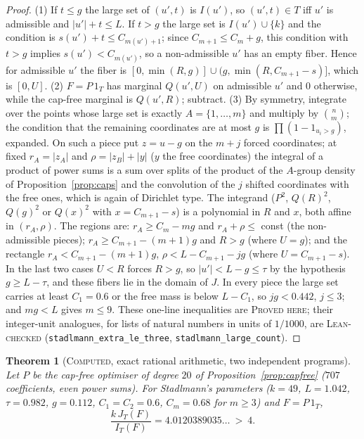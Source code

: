 \documentclass[11pt]{amsart}
\newtheorem{theorem}{Theorem}
\theoremstyle{definition}
\theoremstyle{remark}
\newcommand{\lbl}[1]{\textup{\textsc{#1}}}
\begin{document}
\begin{proof}
(1) If $t\le g$ the large set of $(u',t)$ is $I(u')$, so $(u',t)\in T$ iff
$u'$ is admissible and $|u'|+t\le L$. If $t>g$ the large set is
$I(u')\cup\{k\}$ and the condition is $s(u')+t\le C_{m(u')+1}$; since
$C_{m+1}\le C_m+g$, this condition with $t>g$ implies
$s(u')<C_{m(u')}$, so a non-admissible $u'$ has an empty fiber. Hence for
admissible $u'$ the fiber is $[0,\min(R,g)]\cup(g,\min(R,C_{m+1}-s)]$, which
is $[0,U]$. (2) $F=P\,1_T$ has marginal $Q(u',U)$ on admissible $u'$ and $0$
otherwise, while the cap-free marginal is $Q(u',R)$; subtract. (3) By symmetry,
integrate over the points whose large set is exactly $A=\{1,\dots,m\}$ and
multiply by $\binom nm$; the condition that the remaining coordinates are at
most $g$ is $\prod(1-1_{u_i>g})$, expanded. On such a piece put $z=u-g$ on the
$m+j$ forced coordinates; at fixed $r_A=|z_A|$ and $\rho=|z_B|+|y|$ ($y$ the
free coordinates) the integral of a product of power sums is a sum over splits
of the product of the $A$-group density of Proposition~\ref{prop:caps} and the
convolution of the $j$ shifted coordinates with the free ones, which is again
of Dirichlet type. The integrand ($P^2$, $Q(R)^2$, $Q(g)^2$ or $Q(x)^2$ with
$x=C_{m+1}-s$) is a polynomial in $R$ and $x$, both affine in
$(r_A,\rho)$. The regions are: $r_A\ge C_m-mg$ and $r_A+\rho\le$ const
(the non-admissible pieces); $r_A\ge C_{m+1}-(m+1)g$ and $R>g$ (where $U=g$);
and the rectangle $r_A<C_{m+1}-(m+1)g$, $\rho<L-C_{m+1}-jg$ (where
$U=C_{m+1}-s$). In the last two cases $U<R$ forces $R>g$, so
$|u'|<L-g\le\tau$ by the hypothesis $g\ge L-\tau$, and these fibers lie in
the domain of $J$. In every piece the large set carries at least $C_1=0.6$ or
the free mass is below $L-C_1$, so $jg<0.442$, $j\le3$; and $mg<L$ gives
$m\le9$. These one-line inequalities are \lbl{Proved here}; their
integer-unit analogues, for lists of natural numbers in units of $1/1000$,
are \lbl{Lean-checked} (\texttt{stadlmann\_extra\_le\_three},
\texttt{stadlmann\_large\_count}).
\end{proof}

\begin{theorem}[\lbl{Computed}, exact rational arithmetic, two independent programs]\label{thm:capped-exact}
Let $P$ be the cap-free optimiser of degree $20$ of
Proposition~\ref{prop:capfree} ($707$ coefficients, even power sums). For
Stadlmann's parameters ($k=49$, $L=1.042$, $\tau=0.982$, $g=0.112$,
$C_1=C_2=0.6$, $C_m=0.68$ for $m\ge3$) and $F=P\,1_T$,
\[
\frac{k\,J_T(F)}{I_T(F)}=4.0120389035\ldots\ >\ 4 .
\]
\end{theorem}
\end{document}
